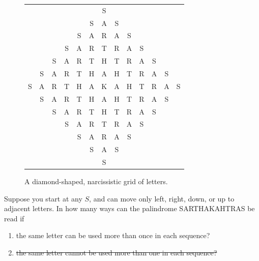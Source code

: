 \documentclass{article}
\begin{document}
    \vspace{1mm}
    \setlength{\tabcolsep}{2.7pt}
    \begin{figure}[hbp]
        \centering
        \begin{tabular}{ccccccccccccc}
            & & & & & & S \\
            & & & & & S & A & S \\
            & & & & S & A & R & A & S \\
            & & & S & A & R & T & R & A & S \\
            & & S & A & R & T & H & T & R & A & S \\
            & S & A & R & T & H & A & H & T & R & A & S \\
            S & A & R & T & H & A & K & A & H & T & R & A & S \\
            & S & A & R & T & H & A & H & T & R & A & S \\
            & & S & A & R & T & H & T & R & A & S \\
            & & & S & A & R & T & R & A & S \\
            & & & & S & A & R & A & S \\
            & & & & & S & A & S \\
            & & & & & & S
        \end{tabular}
        \caption{A diamond-shaped, narcissistic grid of letters.}
        \label{E2}
    \end{figure}
    
    Suppose you start at any $S$, and can move only left, right, down, or up to adjacent letters. In how many ways can the palindrome SARTHAKAHTRAS be read if
    \begin{enumerate}
        \item the same letter can be used more than once in each sequence?
        \item \st{the same letter cannot be used more than one in each sequence?}
    \end{enumerate}
\end{document}
